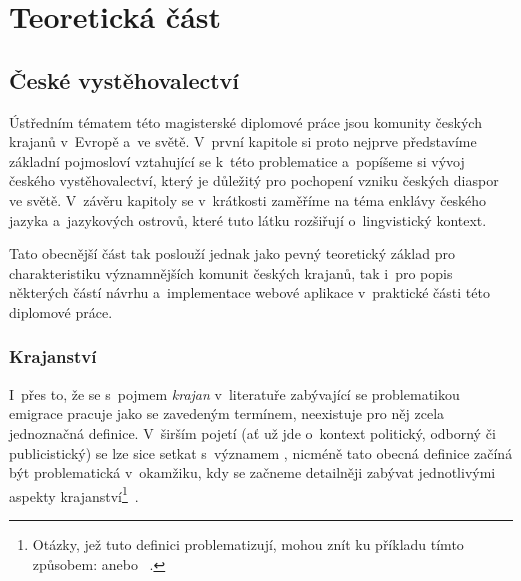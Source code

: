 \part{Teoretická část}

\hypertarget{ux10deskuxe9-vystux11bhovalectvuxed}{%
\chapter{České vystěhovalectví}\label{ux10deskuxe9-vystux11bhovalectvuxed}}

Ústředním tématem této magisterské diplomové práce jsou komunity českých krajanů v~Evropě a~ve světě. V~první kapitole si proto nejprve představíme základní pojmosloví vztahující se k~této problematice a~popíšeme si vývoj českého vystěhovalectví, který je důležitý pro pochopení vzniku českých diaspor ve světě. V~závěru kapitoly se v~krátkosti zaměříme na téma enklávy českého jazyka a~jazykových ostrovů, které tuto látku rozšiřují o~lingvistický kontext.

Tato obecnější část tak poslouží jednak jako pevný teoretický základ pro charakteristiku významnějších komunit českých krajanů, tak i~pro popis některých částí návrhu a~implementace webové aplikace v~praktické části této diplomové práce.

\hypertarget{krajanstvuxed}{%
\section{Krajanství}\label{krajanstvuxed}}

I~přes to, že se s~pojmem \emph{krajan} v~literatuře zabývající se problematikou emigrace pracuje jako se zavedeným termínem, neexistuje pro něj zcela jednoznačná definice. V~širším pojetí (ať už jde o~kontext politický, odborný či publicistický) se lze sice setkat s~významem , nicméně tato obecná definice začíná být problematická v~okamžiku, kdy se začneme detailněji zabývat jednotlivými aspekty krajanství\footnote{Otázky, jež tuto definici problematizují, mohou znít ku příkladu tímto způsobem:  anebo ~\parencite{Jakoubek2015}.}~\parencite{Jakoubek2015}.

